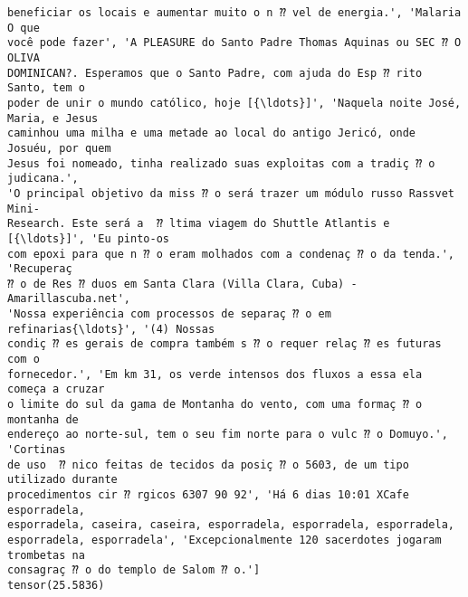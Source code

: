 \documentclass[10pt]{article}
\begin{document}
\begin{Verbatim}[commandchars=\\\{\}]
beneficiar os locais e aumentar muito o n ⁇ vel de energia.', 'Malaria O que
você pode fazer', 'A PLEASURE do Santo Padre Thomas Aquinas ou SEC ⁇ O OLIVA
DOMINICAN?. Esperamos que o Santo Padre, com ajuda do Esp ⁇ rito Santo, tem o
poder de unir o mundo católico, hoje [{\ldots}]', 'Naquela noite José, Maria, e Jesus
caminhou uma milha e uma metade ao local do antigo Jericó, onde Josuéu, por quem
Jesus foi nomeado, tinha realizado suas exploitas com a tradiç ⁇ o judicana.',
'O principal objetivo da miss ⁇ o será trazer um módulo russo Rassvet Mini-
Research. Este será a  ⁇ ltima viagem do Shuttle Atlantis e [{\ldots}]', 'Eu pinto-os
com epoxi para que n ⁇ o eram molhados com a condenaç ⁇ o da tenda.', 'Recuperaç
⁇ o de Res ⁇ duos em Santa Clara (Villa Clara, Cuba) - Amarillascuba.net',
'Nossa experiência com processos de separaç ⁇ o em refinarias{\ldots}', '(4) Nossas
condiç ⁇ es gerais de compra também s ⁇ o requer relaç ⁇ es futuras com o
fornecedor.', 'Em km 31, os verde intensos dos fluxos a essa ela começa a cruzar
o limite do sul da gama de Montanha do vento, com uma formaç ⁇ o montanha de
endereço ao norte-sul, tem o seu fim norte para o vulc ⁇ o Domuyo.', 'Cortinas
de uso  ⁇ nico feitas de tecidos da posiç ⁇ o 5603, de um tipo utilizado durante
procedimentos cir ⁇ rgicos 6307 90 92', 'Há 6 dias 10:01 XCafe esporradela,
esporradela, caseira, caseira, esporradela, esporradela, esporradela,
esporradela, esporradela', 'Excepcionalmente 120 sacerdotes jogaram trombetas na
consagraç ⁇ o do templo de Salom ⁇ o.']
tensor(25.5836)
    \end{Verbatim}
\end{document}
